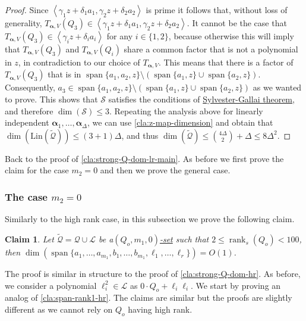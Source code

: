 \documentclass[10pt,a4paper]{article}
\newtheorem{claim}[theorem]{Claim}
\def\rank{\operatorname{rank}}
\newcommand{\vecalpha}{\boldsymbol{\alpha}}
\newcommand{\vaa}{{\vecalpha}}
\newcommand{\calL}{{\mathcal{L}}}
\newcommand{\cQ}{{\mathcal{Q}}}
\newcommand{\calS}{{\mathcal{S}}}
\newcommand{\ideal}[1]{\left \langle{#1}\right \rangle}
\newcommand{\MVar}[2]{{#1}_1,\ldots, {#1}_{#2}}
\newcommand{\spn}[1]{\operatorname{span}\{{#1}\}}
\newcommand{\rkq}{100}
\newcommand{\MS}{\text{Lin}}
\begin{document}
\begin{proof}
	Since $\ideal{\gamma_1 z + \delta_1 a_1, \gamma_2 z + \delta_2 a_2}$ is prime it follows that, without loss of generality, $T_{\vaa,V}(Q_3)\in\ideal{\gamma_1 z + \delta_1 a_1, \gamma_2 z + \delta_2 a_2}$. It cannot be the case that $T_{\vaa,V}(Q_3)\in\ideal{\gamma_i z + \delta_i a_i}$ for any $i \in \{1,2\}$, because otherwise this will imply that $T_{\vaa,V}(Q_3)$ and $T_{\vaa,V}(Q_i)$ share a common factor that is not a polynomial in $z$, in contradiction to our choice of $T_{\vaa, V}$. This means that there is a factor of $T_{\vaa,V}(Q_3)$ that is in $\spn{a_1,a_2,z} \setminus \left(\spn{a_1,z}\cup \spn{a_2,z}\right)$.
	Consequently, $a_3 \in \spn{a_1,a_2,z} \setminus \left(\spn{a_1,z}\cup \spn{a_2,z}\right)$ as we wanted to prove.
	This shows that $\calS$ satisfies the conditions of \hyperref[thm:SG-linforms]{Sylvester-Gallai theorem}, and therefore $\dim(\calS)\leq 3$. Repeating the analysis above for linearly independent $\MVar{\vaa}{\Delta}$, we can use \autoref{cla:z-map-dimension} and obtain that $\dim(\MS(\tilde\cQ)) \leq (3+1)\Delta$, and thus $\dim(\tilde{\cQ}) \leq {4\Delta \choose 2}+\Delta \leq 8\Delta^2$. 
\end{proof}



Back to the proof of \autoref{cla:strong-Q-dom-lr-main}. As before we first prove the claim for the case $m_2=0$ and then we prove the general case.

\subsubsection{The case $m_2=0$}

Similarly to the high rank case, in this subsection we prove the following claim.
\begin{claim}\label{cla:strong-Q-dom}
Let $\tilde{\cQ} = \cQ\cup \calL$ be a\hyperref[def:Q-dom]{$(Q_o,m_1,0)$-set} such that $2\leq \rank_s(Q_o)< \rkq$,
then  $\dim(\spn{\MVar{a}{m_1},\MVar{b}{m_1},\MVar{\ell}{r}}) = O(1)$.
\end{claim}

The proof is similar in structure to the proof of \autoref{cla:strong-Q-dom-hr}.
As before, we consider a polynomial $\ell_i^2\in \calL$ as $0\cdot Q_o+ \ell_i\ell_i$.
We start by proving an analog of \autoref{cla:span-rank1-hr}. The claims are similar but the proofs are slightly different as we cannot rely on $Q_o$ having high rank. 
\end{document}
